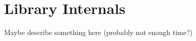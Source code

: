 \chapter{Library Internals} \label{chap:internals}

Maybe describe something here (probably not enough time?)